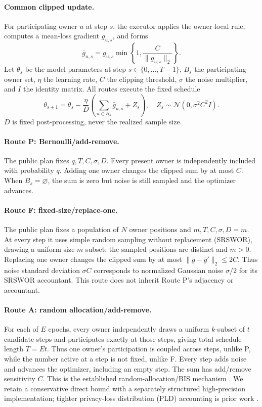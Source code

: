 \documentclass[letterpaper]{article}
\begin{document}
\paragraph{Common clipped update.}
For participating owner $u$ at step $s$, the executor applies the owner-local
rule, computes a mean-loss gradient $g_{u,s}$, and forms
\[
 \bar g_{u,s}=g_{u,s}\min\left\{1,
       \frac{C}{\lVert g_{u,s}\rVert_2}\right\}.
\]
Let $\theta_s$ be the model parameters at step
$s\in\{0,\ldots,T-1\}$, $B_s$ the participating-owner set, $\eta$ the
learning rate, $C$ the clipping threshold, $\sigma$ the noise multiplier, and
$I$ the identity matrix.
All routes execute the fixed schedule
\begin{equation}
\theta_{s+1}=\theta_s-\frac{\eta}{D}
\left(\sum_{u\in B_s}\bar g_{u,s}+Z_s\right),\quad
Z_s\sim\mathcal N(0,\sigma^2C^2 I).
\label{eq:update}
\end{equation}
$D$ is fixed post-processing, never the realized sample size.

\paragraph{Route P: Bernoulli/add-remove.}
The public plan fixes $q,T,C,\sigma,D$.  Every present owner is independently
included with probability $q$.  Adding one owner changes the clipped sum by at
most $C$.  When $B_s=\varnothing$, the sum is zero but noise is still sampled
and the optimizer advances.

\paragraph{Route F: fixed-size/replace-one.}
The public plan fixes a population of $N$ owner positions and
$m,T,C,\sigma,D=m$.  At every step it uses simple random sampling without
replacement (SRSWOR), drawing a uniform size-$m$ subset; the sampled positions
are distinct and $m>0$.  Replacing one
owner changes the clipped sum by at most
$\lVert\bar g-\bar g'\rVert_2\leq 2C$.  Thus noise standard deviation
$\sigma C$ corresponds to normalized Gaussian noise $\sigma/2$ for its
SRSWOR accountant.  This route does not inherit Route P's adjacency or
accountant.

\paragraph{Route A: random allocation/add-remove.}
For each of $E$ epochs, every owner independently draws a uniform $k$-subset
of $t$ candidate steps and participates exactly at those steps, giving total
schedule length $T=Et$.  Thus one owner's
participation is coupled across steps, unlike P, while the number active at a
step is not fixed, unlike F.  Every step adds noise and advances the optimizer,
including an empty step.  The sum has add/remove sensitivity $C$.  This is the
established random-allocation/BIS mechanism
\citep{shenfeld2025randomallocation,dong2026lessrandom}.  We retain a
conservative direct bound with a separately structured high-precision
implementation; tighter privacy-loss distribution (PLD) accounting is prior
work \citep{feldman2026efficientallocation}.
\end{document}
